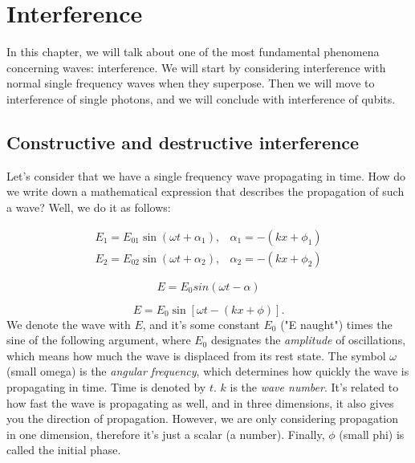 \chapter{Interference}

In this chapter, we will talk about one of the most fundamental phenomena concerning waves: interference. We will start by considering interference with normal single frequency waves when they superpose. Then we will move to interference of single photons, and we will conclude with interference of qubits.

\section{Constructive and destructive interference}



Let's consider that we have a single frequency wave propagating in time. How do we write down a mathematical expression that describes the propagation of such a wave? Well, we do it as follows:

\begin{equation}
\begin{array}{ll}
E_{1}=E_{01} \sin \left(\omega t+\alpha_{1}\right), & \alpha_{1}=-\left(k x+\phi_{1}\right) \\
E_{2}=E_{02} \sin \left(\omega t+\alpha_{2}\right), & \alpha_{2}=-\left(k x+\phi_{2}\right)
\end{array}
\end{equation}


\begin{equation}
E = E_0 sin(\omega t - \alpha)
\end{equation}
\fi

\begin{equation}
E=E_0 \sin [\omega t-(k x+\phi)].
\end{equation}
We denote the wave with $E$, and it's some constant $E_0$ ("E naught") times the sine of the following argument, where $E_0$ designates the \emph{amplitude} of oscillations, which means how much the wave is displaced from its rest state. The symbol $\omega$ (small omega) is the \emph{angular frequency}, which determines how quickly the wave is propagating in time. Time is denoted by $t$. $k$ is the \emph{wave number}. It's related to how fast the wave is propagating as well, and in three dimensions, it also gives you the direction of propagation. However, we are only considering propagation in one dimension, therefore it's just a scalar (a number). Finally, $\phi$ (small phi) is called the initial phase.

